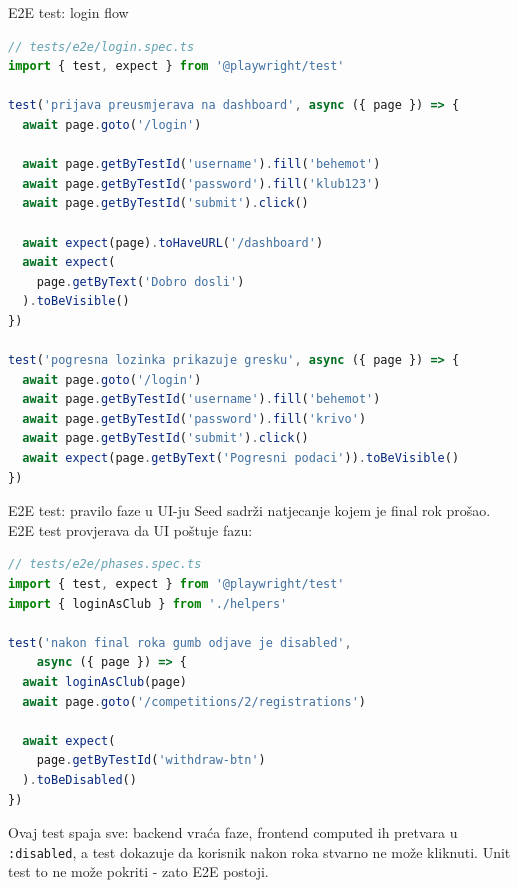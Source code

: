 \begin{frame}[fragile,shrink=5]{E2E test: login flow}
\begin{lstlisting}[language=typescript]
// tests/e2e/login.spec.ts
import { test, expect } from '@playwright/test'

test('prijava preusmjerava na dashboard', async ({ page }) => {
  await page.goto('/login')

  await page.getByTestId('username').fill('behemot')
  await page.getByTestId('password').fill('klub123')
  await page.getByTestId('submit').click()

  await expect(page).toHaveURL('/dashboard')
  await expect(
    page.getByText('Dobro dosli')
  ).toBeVisible()
})

test('pogresna lozinka prikazuje gresku', async ({ page }) => {
  await page.goto('/login')
  await page.getByTestId('username').fill('behemot')
  await page.getByTestId('password').fill('krivo')
  await page.getByTestId('submit').click()
  await expect(page.getByText('Pogresni podaci')).toBeVisible()
})
\end{lstlisting}
\end{frame}

\begin{frame}[fragile,shrink=5]{E2E test: pravilo faze u UI-ju}
Seed sadrži natjecanje kojem je final rok prošao. E2E test provjerava da UI poštuje fazu:

\begin{lstlisting}[language=typescript]
// tests/e2e/phases.spec.ts
import { test, expect } from '@playwright/test'
import { loginAsClub } from './helpers'

test('nakon final roka gumb odjave je disabled',
    async ({ page }) => {
  await loginAsClub(page)
  await page.goto('/competitions/2/registrations')

  await expect(
    page.getByTestId('withdraw-btn')
  ).toBeDisabled()
})
\end{lstlisting}

\vspace{0.4em}
Ovaj test spaja sve: backend vraća faze, frontend computed ih pretvara u \texttt{:disabled}, a test dokazuje da korisnik nakon roka stvarno ne može kliknuti. Unit test to ne može pokriti - zato E2E postoji.
\end{frame}


